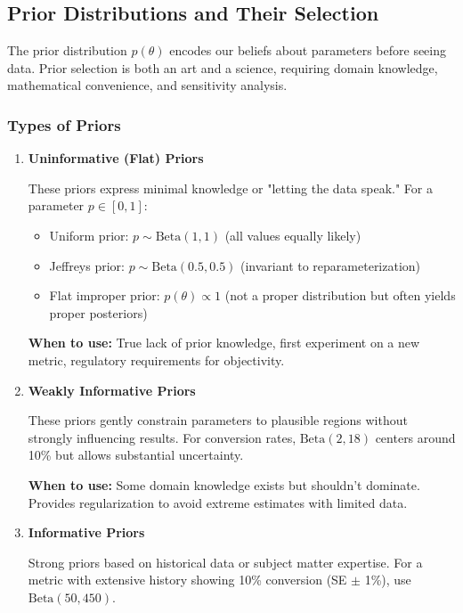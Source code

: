 \subsection{Prior Distributions and Their Selection}

The prior distribution $p(\theta)$ encodes our beliefs about parameters before seeing data. Prior selection is both an art and a science, requiring domain knowledge, mathematical convenience, and sensitivity analysis.

\subsubsection{Types of Priors}

\begin{enumerate}
    \item \textbf{Uninformative (Flat) Priors}

    These priors express minimal knowledge or "letting the data speak." For a parameter $p \in [0,1]$:
    \begin{itemize}
        \item Uniform prior: $p \sim \text{Beta}(1, 1)$ (all values equally likely)
        \item Jeffreys prior: $p \sim \text{Beta}(0.5, 0.5)$ (invariant to reparameterization)
        \item Flat improper prior: $p(\theta) \propto 1$ (not a proper distribution but often yields proper posteriors)
    \end{itemize}

    \textbf{When to use:} True lack of prior knowledge, first experiment on a new metric, regulatory requirements for objectivity.

    \item \textbf{Weakly Informative Priors}

    These priors gently constrain parameters to plausible regions without strongly influencing results. For conversion rates, $\text{Beta}(2, 18)$ centers around 10\% but allows substantial uncertainty.

    \textbf{When to use:} Some domain knowledge exists but shouldn't dominate. Provides regularization to avoid extreme estimates with limited data.

    \item \textbf{Informative Priors}

    Strong priors based on historical data or subject matter expertise. For a metric with extensive history showing 10\% conversion (SE $\pm$ 1\%), use $\text{Beta}(50, 450)$.


\end{enumerate}
